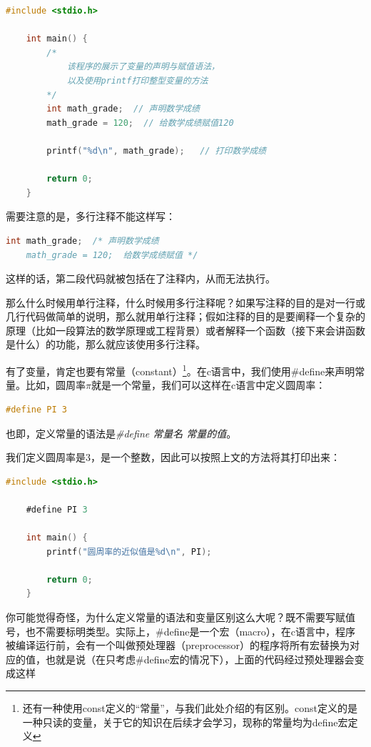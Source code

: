 \begin{lstlisting}[language=C]
    #include <stdio.h>

    int main() {
        /*
            该程序的展示了变量的声明与赋值语法，
            以及使用printf打印整型变量的方法
        */
        int math_grade;  // 声明数学成绩
        math_grade = 120;  // 给数学成绩赋值120

        printf("%d\n", math_grade);   // 打印数学成绩

        return 0;
    }
\end{lstlisting}

需要注意的是，多行注释不能这样写：

\begin{lstlisting}[language=C]
    int math_grade;  /* 声明数学成绩 
    math_grade = 120;  给数学成绩赋值 */
\end{lstlisting}

这样的话，第二段代码就被包括在了注释内，从而无法执行。

那么什么时候用单行注释，什么时候用多行注释呢？如果写注释的目的是对一行或几行代码做简单的说明，那么就用单行注释；假如注释的目的是要阐释一个复杂的原理（比如一段算法的数学原理或工程背景）或者解释一个函数（接下来会讲函数是什么）的功能，那么就应该使用多行注释。

有了变量，肯定也要有常量（constant）\footnote{还有一种使用const定义的“常量”，与我们此处介绍的有区别。const定义的是一种只读的变量，关于它的知识在后续才会学习，现称的常量均为define宏定义}。在c语言中，我们使用\#define来声明常量。比如，圆周率$\pi$就是一个常量，我们可以这样在c语言中定义圆周率：

\begin{lstlisting}[language=C]
    #define PI 3 
\end{lstlisting}

也即，定义常量的语法是\textit{\#define 常量名 常量的值}。

我们定义圆周率是3，是一个整数，因此可以按照上文的方法将其打印出来：

\begin{lstlisting}[language=C]
    #include <stdio.h>

    #define PI 3

    int main() {
        printf("圆周率的近似值是%d\n", PI);

        return 0;
    }
\end{lstlisting}

你可能觉得奇怪，为什么定义常量的语法和变量区别这么大呢？既不需要写赋值号，也不需要标明类型。实际上，\#define是一个宏（macro），在c语言中，程序被编译运行前，会有一个叫做预处理器（preprocessor）的程序将所有宏替换为对应的值，也就是说（在只考虑\#define宏的情况下），上面的代码经过预处理器会变成这样

